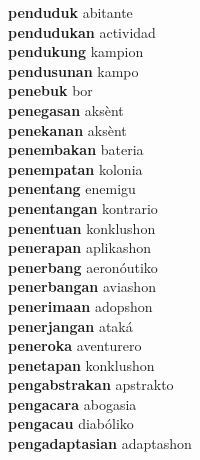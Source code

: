 \textbf{penduduk } abitante \\
\textbf{pendudukan } actividad \\
\textbf{pendukung } kampion \\
\textbf{pendusunan } kampo \\
\textbf{penebuk } bor \\
\textbf{penegasan } aksènt \\
\textbf{penekanan } aksènt \\
\textbf{penembakan } bateria \\
\textbf{penempatan } kolonia \\
\textbf{penentang } enemigu \\
\textbf{penentangan } kontrario \\
\textbf{penentuan } konklushon \\
\textbf{penerapan } aplikashon \\
\textbf{penerbang } aeronóutiko \\
\textbf{penerbangan } aviashon \\
\textbf{penerimaan } adopshon \\
\textbf{penerjangan } ataká \\
\textbf{peneroka } aventurero \\
\textbf{penetapan } konklushon \\
\textbf{pengabstrakan } apstrakto \\
\textbf{pengacara } abogasia \\
\textbf{pengacau } diabóliko \\
\textbf{pengadaptasian } adaptashon \\
